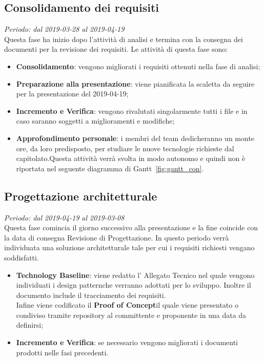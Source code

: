 \subsection{Consolidamento dei requisiti}
\textit{Periodo: dal 2019-03-28 al 2019-04-19} \\
Questa fase ha inizio dopo l'attività di analisi e termina con la consegna dei documenti per la revisione dei requisiti. Le attività 
di questa fase sono:
\begin{itemize}
	\item \textbf{Consolidamento}: vengono migliorati i requisiti ottenuti nella fase di analisi;
	\item \textbf{Preparazione alla presentazione}: viene pianificata la scaletta da seguire per la presentazione del 2019-04-19;
	\item \textbf{Incremento e Verifica}: vengono rivalutati singolarmente tutti i file e in caso saranno soggetti a miglioramenti e modifiche;
	\item \textbf{Approfondimento personale}: i membri del team dedicheranno un monte ore, da loro predisposto, per studiare le nuove tecnologie richieste dal capitolato\glo.Questa attività verrà svolta in modo autonomo e quindi non è riportata nel seguente diagramma di Gantt~\ref{fig:gantt_con}.
\end{itemize}
%

\subsection{Progettazione architetturale}
\textit{Periodo: dal 2019-04-19 al 2019-03-08} \\
Questa fase comincia il giorno successivo alla presentazione e la fine coincide con la data di consegna Revisione di 
Progettazione. In questo periodo verrà individuata una soluzione architetturale 
tale per cui i requisiti richiesti vengano soddisfatti.
\begin{itemize}
	\item \textbf{Technology Baseline}: viene redatto l'
	Allegato Tecnico  nel quale vengono 
	individuati i design 
	pattern\glosp che verranno adottati per lo sviluppo. Inoltre il documento 
	include il tracciamento dei requisiti.\\
	Infine viene codificato il \textbf{Proof of Concept}\glosp il 
	quale viene presentato o condiviso tramite repository al committente e 
	proponente in una data da definirsi;
	\item \textbf{Incremento e Verifica}: se necessario vengono migliorati i 
	documenti prodotti nelle fasi precedenti.
\end{itemize}

